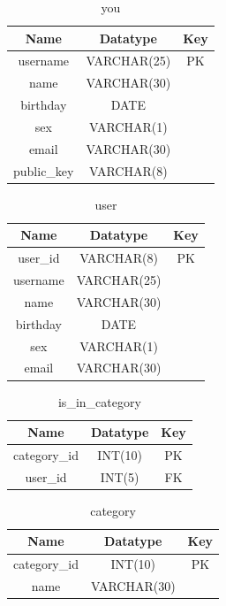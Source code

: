 \begin{table}[!ht]
\caption{you}
\centering
\begin{tabular}{c c c}
\hline\hline
Name               & Datatype    & Key \\
\hline
username           & VARCHAR(25) & PK   \\
name               & VARCHAR(30) &      \\
birthday           & DATE        &      \\
sex                & VARCHAR(1)  &      \\
email              & VARCHAR(30) &      \\
public\_key        & VARCHAR(8)  &      \\
\hline
\end{tabular}
\label{table:nonlin}
\end{table}

\begin{table}[!ht]
\caption{user}
\centering
\begin{tabular}{c c c}
\hline\hline
Name               & Datatype    & Key \\
\hline
user\_id           & VARCHAR(8)  & PK \\  %
username           & VARCHAR(25) &    \\
name               & VARCHAR(30) &    \\
birthday           & DATE        &    \\
sex                & VARCHAR(1)  &    \\
email              & VARCHAR(30) &    \\
\hline
\end{tabular}
\label{table:nonlin}
\end{table}

\begin{table}[!ht]
\caption{is\_in\_category}
\centering
\begin{tabular}{c c c}
\hline\hline
Name               & Datatype    & Key \\
\hline
category\_id       & INT(10)     & PK   \\
user\_id           & INT(5)      & FK   \\
\hline
\end{tabular}
\label{table:nonlin}
\end{table}

\begin{table}[!ht]
\caption{category}
\centering
\begin{tabular}{c c c}
\hline\hline
Name               & Datatype    & Key \\
\hline
category\_id       & INT(10)     & PK  \\
name               & VARCHAR(30) &     \\
\hline
\end{tabular}
\label{table:nonlin}
\end{table}



